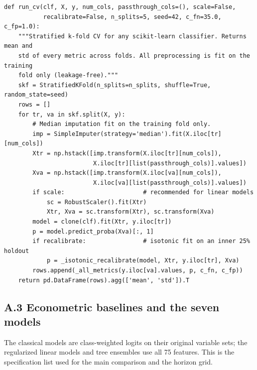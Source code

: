 \documentclass[12pt,a4paper]{article}
\begin{document}
\begin{lstlisting}[style=python]
def run_cv(clf, X, y, num_cols, passthrough_cols=(), scale=False,
           recalibrate=False, n_splits=5, seed=42, c_fn=35.0, c_fp=1.0):
    """Stratified k-fold CV for any scikit-learn classifier. Returns mean and
    std of every metric across folds. All preprocessing is fit on the training
    fold only (leakage-free)."""
    skf = StratifiedKFold(n_splits=n_splits, shuffle=True, random_state=seed)
    rows = []
    for tr, va in skf.split(X, y):
        # Median imputation fit on the training fold only.
        imp = SimpleImputer(strategy='median').fit(X.iloc[tr][num_cols])
        Xtr = np.hstack([imp.transform(X.iloc[tr][num_cols]),
                         X.iloc[tr][list(passthrough_cols)].values])
        Xva = np.hstack([imp.transform(X.iloc[va][num_cols]),
                         X.iloc[va][list(passthrough_cols)].values])
        if scale:                      # recommended for linear models
            sc = RobustScaler().fit(Xtr)
            Xtr, Xva = sc.transform(Xtr), sc.transform(Xva)
        model = clone(clf).fit(Xtr, y.iloc[tr])
        p = model.predict_proba(Xva)[:, 1]
        if recalibrate:                # isotonic fit on an inner 25% holdout
            p = _isotonic_recalibrate(model, Xtr, y.iloc[tr], Xva)
        rows.append(_all_metrics(y.iloc[va].values, p, c_fn, c_fp))
    return pd.DataFrame(rows).agg(['mean', 'std']).T
\end{lstlisting}

\subsection*{A.3 Econometric baselines and the seven models}

The classical models are class-weighted logits on their original variable
sets; the regularized linear models and tree ensembles use all 75 features.
This is the specification list used for the main comparison and the horizon
grid.
\end{document}
